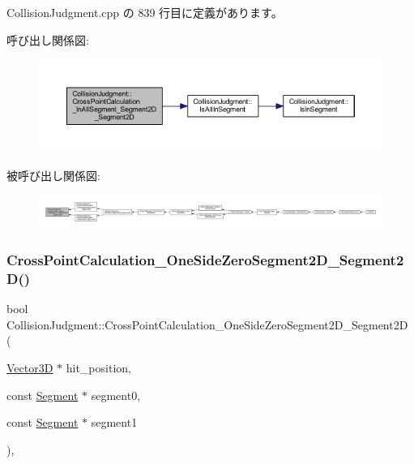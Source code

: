  Collision\+Judgment.\+cpp の 839 行目に定義があります。

呼び出し関係図\+:\nopagebreak
\begin{figure}[H]
\begin{center}
\leavevmode
\includegraphics[width=350pt]{class_collision_judgment_a93ec7cb67dde5798661d14c52272dc99_cgraph}
\end{center}
\end{figure}
被呼び出し関係図\+:
\nopagebreak
\begin{figure}[H]
\begin{center}
\leavevmode
\includegraphics[width=350pt]{class_collision_judgment_a93ec7cb67dde5798661d14c52272dc99_icgraph}
\end{center}
\end{figure}
\mbox{\label{class_collision_judgment_aef83b0d1bff8ede9c3e1f836694a3153}} 
\subsubsection{\texorpdfstring{Cross\+Point\+Calculation\+\_\+\+One\+Side\+Zero\+Segment2\+D\+\_\+\+Segment2\+D()}{CrossPointCalculation\_OneSideZeroSegment2D\_Segment2D()}}
{\footnotesize\ttfamily bool Collision\+Judgment\+::\+Cross\+Point\+Calculation\+\_\+\+One\+Side\+Zero\+Segment2\+D\+\_\+\+Segment2D (\begin{DoxyParamCaption}\item[{\mbox{\hyperlink{class_vector3_d}{Vector3D}} $\ast$}]{hit\+\_\+position,  }\item[{const \mbox{\hyperlink{class_segment}{Segment}} $\ast$}]{segment0,  }\item[{const \mbox{\hyperlink{class_segment}{Segment}} $\ast$}]{segment1 }\end{DoxyParamCaption})\hspace{0.3cm}{\ttfamily [static]}, {\ttfamily [private]}}



